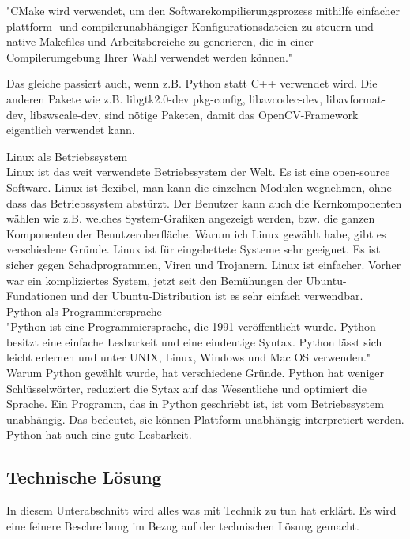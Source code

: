 "CMake wird verwendet, um den Softwarekompilierungsprozess mithilfe einfacher plattform- und compilerunabh\"angiger Konfigurationsdateien zu steuern und native Makefiles und Arbeitsbereiche zu generieren, die in einer Compilerumgebung Ihrer Wahl verwendet werden k\"onnen."\cite{cmake}

Das gleiche passiert auch, wenn z.B. Python statt C++ verwendet wird. Die anderen Pakete wie z.B. libgtk2.0-dev pkg-config, libavcodec-dev, libavformat-dev, libswscale-dev, sind n\"otige Paketen, damit das OpenCV-Framework eigentlich verwendet kann. 
 
Linux als Betriebssystem \cite{Linux_Betriebssystem}  \\
Linux ist das weit verwendete Betriebssystem der Welt. Es ist eine open-source Software. Linux ist flexibel, man kann die einzelnen Modulen wegnehmen, ohne dass das Betriebssystem abst\"urzt. Der Benutzer kann auch die Kernkomponenten w\"ahlen wie z.B. welches System-Grafiken angezeigt werden, bzw. die ganzen Komponenten der Benutzeroberfl\"ache. Warum ich Linux gew\"ahlt habe, gibt es verschiedene Gr\"unde. Linux ist f\"ur eingebettete Systeme sehr geeignet. Es ist sicher gegen Schadprogrammen, Viren und Trojanern. Linux ist einfacher. Vorher war ein kompliziertes System, jetzt seit den Bem\"uhungen der Ubuntu-Fundationen und der Ubuntu-Distribution ist es sehr einfach verwendbar.\\
Python als Programmiersprache \\
"Python ist eine Programmiersprache, die 1991 ver\"offentlicht wurde. Python besitzt eine einfache Lesbarkeit und eine eindeutige Syntax. Python l\"asst sich leicht erlernen und unter UNIX, Linux, Windows und Mac OS verwenden." \cite{python} Warum Python gew\"ahlt wurde, hat verschiedene Gr\"unde. Python hat weniger Schl\"usselw\"orter, reduziert die Sytax auf das Wesentliche und optimiert die Sprache. Ein Programm, das in Python geschriebt ist, ist vom Betriebssystem unabh\"angig. Das bedeutet, sie k\"onnen Plattform unabh\"angig interpretiert werden. Python hat auch eine gute Lesbarkeit. \\ 
	
\subsection{Technische L\"osung}
In diesem Unterabschnitt wird alles was mit Technik zu tun hat erkl\"art. Es wird eine feinere Beschreibung im Bezug auf der technischen Lösung gemacht.
\\
\\

